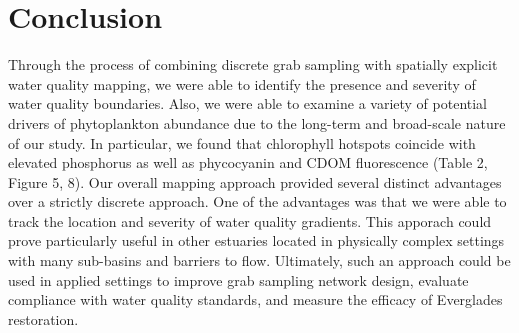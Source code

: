 \section{Conclusion}
\label{conclusion}

	Through the process of combining discrete grab sampling with spatially explicit water quality mapping, we were able to identify the presence and severity of water quality boundaries. Also, we were able to examine a variety of potential drivers of phytoplankton abundance due to the long-term and broad-scale nature of our study. In particular, we found that chlorophyll hotspots coincide with elevated phosphorus as well as phycocyanin and CDOM fluorescence (Table 2, Figure 5, 8). Our overall mapping approach provided several distinct advantages over a strictly discrete approach. One of the advantages was that we were able to track the location and severity of water quality gradients. This apporach could prove particularly useful in other estuaries located in physically complex settings with many sub-basins and barriers to flow.	Ultimately, such an approach could be used in applied settings to improve grab sampling network design, evaluate compliance with water quality standards, and measure the efficacy of Everglades restoration.


%

%




%
%

